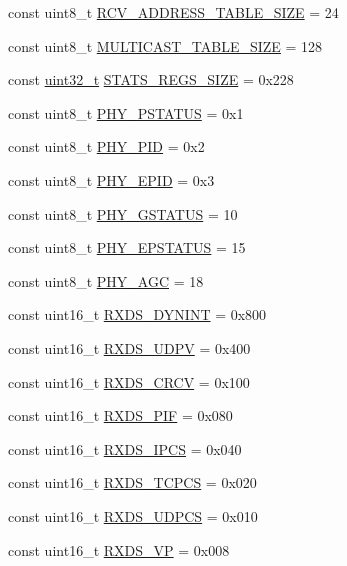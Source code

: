\begin{DoxyCompactItemize}
\item 
const uint8\_\-t \hyperlink{namespaceiGbReg_ae95e1095a77a684508db779465f21ac2}{RCV\_\-ADDRESS\_\-TABLE\_\-SIZE} = 24
\item 
const uint8\_\-t \hyperlink{namespaceiGbReg_add8f1abdb23d74212253f11efe13a39e}{MULTICAST\_\-TABLE\_\-SIZE} = 128
\item 
const \hyperlink{Type_8hh_a435d1572bf3f880d55459d9805097f62}{uint32\_\-t} \hyperlink{namespaceiGbReg_afe2d5a9d5db647d74a2be5dda7a68a4e}{STATS\_\-REGS\_\-SIZE} = 0x228
\item 
const uint8\_\-t \hyperlink{namespaceiGbReg_acf8e6d74b74043a94123494f59e5290c}{PHY\_\-PSTATUS} = 0x1
\item 
const uint8\_\-t \hyperlink{namespaceiGbReg_a6d9d5028ca2b10a8ba5f3258c911f416}{PHY\_\-PID} = 0x2
\item 
const uint8\_\-t \hyperlink{namespaceiGbReg_ae7c860294aafabac0637c277a62f2465}{PHY\_\-EPID} = 0x3
\item 
const uint8\_\-t \hyperlink{namespaceiGbReg_ae28276ba6b1cfcc81af2fdc6a1653166}{PHY\_\-GSTATUS} = 10
\item 
const uint8\_\-t \hyperlink{namespaceiGbReg_aff7f1306a9de79c36e623d6f5aacdaba}{PHY\_\-EPSTATUS} = 15
\item 
const uint8\_\-t \hyperlink{namespaceiGbReg_a1333beab814f70ad2fd81e39bcd47878}{PHY\_\-AGC} = 18
\item 
const uint16\_\-t \hyperlink{namespaceiGbReg_adc8a4e89db2d1c46c873fdf515ed99dc}{RXDS\_\-DYNINT} = 0x800
\item 
const uint16\_\-t \hyperlink{namespaceiGbReg_a8ba647bd48d3efd4636a1aad66243bbe}{RXDS\_\-UDPV} = 0x400
\item 
const uint16\_\-t \hyperlink{namespaceiGbReg_a2fac9a66d8928f307a3e062231131524}{RXDS\_\-CRCV} = 0x100
\item 
const uint16\_\-t \hyperlink{namespaceiGbReg_a521f1e9609640a6286ad12c4dd331833}{RXDS\_\-PIF} = 0x080
\item 
const uint16\_\-t \hyperlink{namespaceiGbReg_a9b0cee9a8ec0a27995db39860d0ce4e1}{RXDS\_\-IPCS} = 0x040
\item 
const uint16\_\-t \hyperlink{namespaceiGbReg_aae99bf9f9557cc9d2719664210d34678}{RXDS\_\-TCPCS} = 0x020
\item 
const uint16\_\-t \hyperlink{namespaceiGbReg_a390b7297c53140bdea8b79e91d128150}{RXDS\_\-UDPCS} = 0x010
\item 
const uint16\_\-t \hyperlink{namespaceiGbReg_a4852770fe6f6c4babbbb589ef2038f16}{RXDS\_\-VP} = 0x008

\end{DoxyCompactItemize}
